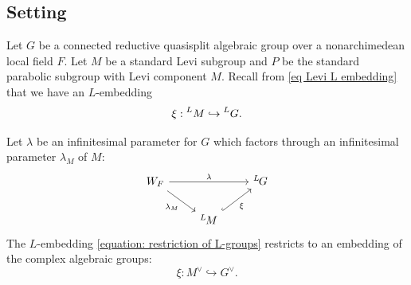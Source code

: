 \documentclass[11pt,letterpaper]{amsart}
\newcommand{\dualgroup}[1]{{#1}^\vee}
\newcommand{\Lgroup}[1]{{\hskip-2 pt \,^L\hskip-1pt{#1}}}
\renewcommand{\1}{\mathbbm{1}}
\numberwithin{equation}{section}
\begin{document}
{\subsection{Setting}\label{subsection: setting}
Let $G$ be a connected reductive quasisplit algebraic group over a nonarchimedean local field $F$. Let $M$ be a standard Levi subgroup and $P$ be the standard parabolic subgroup with Levi component $M$. Recall from \eqref{eq Levi L embedding} that we have an $L$-embedding 
\begin{equation}\label{equation: restriction of L-groups}
    \xi: \prescript{L}{}{M} \hookrightarrow \prescript{L}{}{G}.
\end{equation} 


Let $\lambda$ be an infinitesimal parameter for $G$ which factors through an infinitesimal parameter $\lambda_M$ of $M$:
\begin{equation}\label{equation: setting inf par factors}%
\begin{tikzcd}
	{W_F} && {\Lgroup{G}} \\
	& {\Lgroup{M}}
	\arrow["\lambda", from=1-1, to=1-3]
	\arrow["{\lambda_M}"', from=1-1, to=2-2]
	\arrow["\xi"', hook, from=2-2, to=1-3]
\end{tikzcd}
\end{equation}
The $L$-embedding \eqref{equation: restriction of L-groups} restricts to an
embedding of the complex algebraic groups:
\begin{equation}\label{equation: embedding of complex dual groups}
    \xi: \dualgroup{M} \hookrightarrow \dualgroup{G}.
\end{equation}

}
\end{document}
